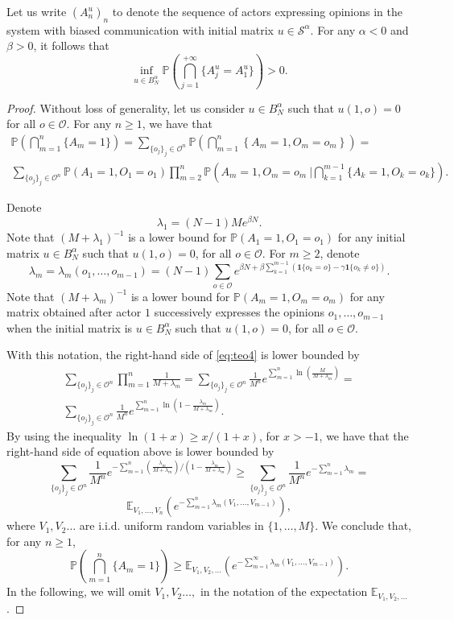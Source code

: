 \documentclass[10pt,a4paper]{amsart}
\def\P{{\mathbb P}}
\newcommand{\opn}{\mathcal{O}}
\newcommand{\st}{\mathcal{S}}
\begin{document}
\begin{proposition} \label{prop2_teo4} Let us write $(A_n^u)_n$ to denote the sequence of actors expressing opinions in the system with biased communication with initial matrix $u\in \st^{\alpha}$. For any $\alpha <0$ and $\beta >0$, it follows that
$$
\inf_{u \in B_N^{\alpha}}\P\left( \bigcap_{j=1}^{+\infty}\{A^u_j=A^u_1\}\right)>0.
$$
\end{proposition}

\begin{proof}
Without loss of generality, 
let us consider $u \in B_N^{\alpha}$ such that $u(1,o)=0$ for all $o \in \opn$. For any $n\geq 1$, we have that
\begin{multline} \label{eq:teo4}
\P\left( \bigcap_{m=1}^{n}\{ A_m = 1\}\right)=\sum_{\{o_j\}_j \in \opn^n}\P\left( \bigcap_{m=1}^{n}\left\{ A_m = 1, O_m=o_m\right\}\right)= \\
\sum_{\{o_j\}_j \in \opn^n}\P(A_1=1,O_1=o_1)
\prod_{m=2}^n\P\left(A_m=1,O_m=o_m\ \Big| \bigcap_{k=1}^{m-1} \{A_k=1,O_k=o_k\} \right).
\end{multline}

Denote
$$
\lambda_1=(N-1)Me^{\beta N}.
$$
Note that $(M+\lambda_1)^{-1}$ is a lower bound for $\P(A_1=1,O_1=o_1)$ for any initial matrix $u \in B_N^{\alpha}$ such that $u(1,o)=0$, for all $o \in \opn$. For $m\geq 2$, denote
\begin{equation} \label{def:lambdam}
\lambda_m=\lambda_m(o_1,\ldots,o_{m-1})=(N-1)\sum_{o\in \opn }e^{\beta N+\beta\sum_{k=1}^{m-1}(\mathbf{1}\{o_k=o\}-\gamma\mathbf{1}\{o_k\neq o\})}.
\end{equation}
Note that $(M+\lambda_m)^{-1}$ is a lower bound for $\P(A_m=1,O_m=o_m)$ for any matrix obtained after actor $1$  successively expresses the opinions $o_1, \ldots, o_{m-1}$ when the initial matrix is $u \in B_N^{\alpha}$ such that $u(1,o)=0$, for all $o \in \opn$. 

With this notation, the right-hand side of \eqref{eq:teo4} is lower bounded by
\begin{multline*}
    \sum_{\{o_j\}_j \in \opn^n}
\prod_{m=1}^n\frac{1}{M+\lambda_m} = \sum_{\{o_j\}_j \in \opn^n} \frac{1}{M^n}e^{
\sum_{m=1}^n\ln\left(\frac{M}{M+\lambda_m}\right)}=
\\ \sum_{\{o_j\}_j \in \opn^n} \frac{1}{M^n}e^{
\sum_{m=1}^n\ln\left(1-\frac{\lambda_m}{M+\lambda_m}\right)}.
\end{multline*}
By using the inequality $\ln(1+x)\geq x/(1+x)$, for $x>-1$, we have that
the right-hand side of equation above is lower bounded by
$$
\sum_{\{o_j\}_j \in \opn^n} \frac{1}{M^n}e^{
-\sum_{m=1}^n\left(\frac{\lambda_m}{M+\lambda_m}\right)\Big/\left(1-\frac{\lambda_m}{M+\lambda_m}\right)} \geq \sum_{\{o_j\}_j \in \opn^n} \frac{1}{M^n}e^{
-\sum_{m=1}^n\lambda_m}=
$$
$$
\mathbb{E}_{V_1,\ldots, V_n}\left(e^{-\sum_{m=1}^{n}\lambda_m(V_1,\dots,V_{m-1})} \right),
$$
where $V_1,V_2 \ldots$ are i.i.d. uniform random variables in $\{1,\ldots, M\}$. 
We conclude that, for any $n\geq 1$,
$$
\P\left( \bigcap_{m=1}^{n}\{ A_m = 1\}\right) \geq \mathbb{E}_{V_1,V_2,\ldots}\left(e^{-\sum_{m=1}^{\infty}\lambda_m(V_1,\dots,V_{m-1})} \right).
$$
In the following, we will omit $V_1,V_2\ldots,$ in the notation of the expectation $\mathbb{E}_{V_1,V_2,\ldots}$.


\end{proof}
\end{document}
